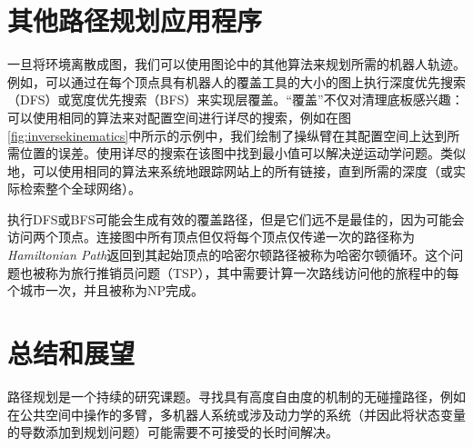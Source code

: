 \section{其他路径规划应用程序}
一旦将环境离散成图，我们可以使用图论中的其他算法来规划所需的机器人轨迹。例如，可以通过在每个顶点具有机器人的覆盖工具的大小的图上执行深度优先搜索（DFS）或宽度优先搜索（BFS）来实现层覆盖。“覆盖”不仅对清理底板感兴趣：可以使用相同的算法来对配置空间进行详尽的搜索，例如在图\ref{fig:inversekinematics}中所示的示例中，我们绘制了操纵臂在其配置空间上达到所需位置的误差。使用详尽的搜索在该图中找到最小值可以解决逆运动学问题。类似地，可以使用相同的算法来系统地跟踪网站上的所有链接，直到所需的深度（或实际检索整个全球网络）。

执行DFS或BFS可能会生成有效的覆盖路径，但是它们远不是最佳的，因为可能会访问两个顶点。连接图中所有顶点但仅将每个顶点仅传递一次的路径称为\emph{Hamiltonian Path}返回到其起始顶点的哈密尔顿路径被称为哈密尔顿循环。这个问题也被称为旅行推销员问题（TSP），其中需要计算一次路线访问他的旅程中的每个城市一次，并且被称为NP完成。


 
\section{总结和展望}
路径规划是一个持续的研究课题。寻找具有高度自由度的机制的无碰撞路径，例如在公共空间中操作的多臂，多机器人系统或涉及动力学的系统（并因此将状态变量的导数添加到规划问题）可能需要不可接受的长时间解决。

